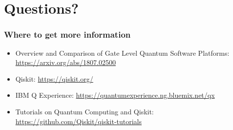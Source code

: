 \documentclass[aspectratio=169,11pt,hyperref={colorlinks=true}]{beamer}
\begin{document}
\section{Questions?}
\begin{frame}
\frametitle{Where to get more information}
    \begin{itemize}
        \item Overview and Comparison of Gate Level Quantum Software Platforms: \href{https://arxiv.org/abs/1807.02500}{https://arxiv.org/abs/1807.02500}
        \item Qiskit: \href{https://qiskit.org/}{https://qiskit.org/}
        \item IBM Q Experience: \href{https://quantumexperience.ng.bluemix.net/qx}{https://quantumexperience.ng.bluemix.net/qx}
        \item Tutorials on Quantum Computing and Qiskit: \href{https://github.com/Qiskit/qiskit-tutorials}{https://github.com/Qiskit/qiskit-tutorials}
    \end{itemize}
\end{frame}
\end{document}
